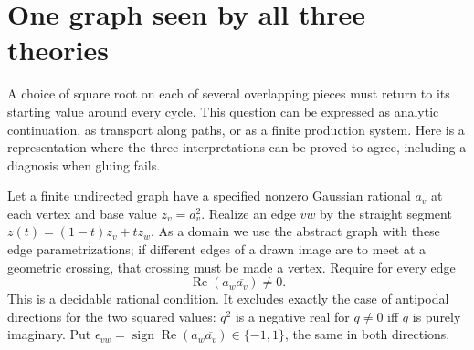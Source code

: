 \section{One graph seen by all three theories}\label{sec:monodromy}
A choice of square root on each of several overlapping pieces must return to its starting value around every cycle. This question can be expressed as analytic continuation, as transport along paths, or as a finite production system. Here is a representation where the three interpretations can be proved to agree, including a diagnosis when gluing fails.

Let a finite undirected graph have a specified nonzero Gaussian rational $a_v$ at each vertex and base value $z_v=a_v^2$. Realize an edge $v w$ by the straight segment $z(t)=(1-t)z_v+t z_w$. As a domain we use the abstract graph with these edge parametrizations; if different edges of a drawn image are to meet at a geometric crossing, that crossing must be made a vertex. Require for every edge
\[
       \operatorname{Re}(a_w\overline{a_v})\ne0 .
\]
This is a decidable rational condition. It excludes exactly the case of antipodal directions for the two squared values: $q^2$ is a negative real for $q\ne0$ iff $q$ is purely imaginary. Put $\epsilon_{vw}=\operatorname{sign}\operatorname{Re}(a_w\overline{a_v})\in\{-1,1\}$, the same in both directions.

